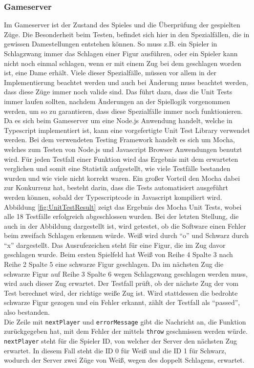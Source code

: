 \documentclass[12pt,a4paper,bibliography=totocnumbered,listof=totocnumbered]{article}
\begin{document}
\subsubsection{Gameserver}
Im Gameserver ist der Zustand des Spieles und die Überprüfung der gespielten Züge. 
Die Besonderheit beim Testen, befindet sich hier in den Spezialfällen, die in gewissen Damestellungen entstehen können. So muss z.B. ein
Spieler in Schlagzwang immer das Schlagen einer Figur ausführen, oder ein Spieler kann nicht noch einmal schlagen, wenn er mit einem Zug bei dem geschlagen worden ist,
eine Dame erhält. Viele dieser Spezialfälle, müssen vor allem in der Implementierung beachtet werden und auch bei Änderung muss beachtet werden, dass 
diese Züge immer noch valide sind. Das führt dazu, dass die Unit Tests immer laufen sollten, nachdem Änderungen an der Spiellogik vorgenommen werden,
um so zu garantieren, dass diese Spezialfälle immer noch funktionieren.
\\
Da es sich beim Gameserver um eine Node.js Anwendung handelt, welche in Typescript implementiert ist, kann eine vorgefertigte Unit Test Library verwendet werden.
Bei dem verwendeten Testing Framework handelt es sich um Mocha, welches zum Testen von Node.js und Javascript Browser Anwendungen benutzt wird. 
Für jeden Testfall einer Funktion wird das Ergebnis mit dem erwarteten verglichen und somit eine Statistik aufgestellt, wie viele Testfälle 
bestanden wurden und wie viele nicht korrekt waren. Ein großer Vorteil den Mocha dabei zur Konkurrenz hat, besteht darin, dass die Tests automatisiert ausgeführt werden 
können, sobald der Typescriptcode in Javascript kompiliert wird.
\\ 
Abbildung \ref{fig:UnitTestResult} zeigt das Ergebnis des Mocha Unit Tests, wobei alle 18 Testfälle erfolgreich abgeschlossen wurden.
Bei der letzten Stellung, die auch in der Abbildung dargestellt ist, wird getestet, ob die Software einen Fehler beim zweifach Schlagen erkennen würde.
Weiß wird durch ``o'' und Schwarz durch ``x'' dargestellt. Das Ausrufezeichen steht für eine Figur, die im Zug davor geschlagen wurde. 
Beim ersten Spielfeld hat Weiß von Reihe 4 Spalte 3 nach Reihe 2 Spalte 5 eine schwarze Figur geschlagen. Da im nächsten Zug die schwarze Figur auf 
Reihe 3 Spalte 6 wegen Schlagzwang geschlagen werden muss, wird auch dieser Zug erwartet. Der Testfall prüft, ob der nächste Zug der 
vom Test berechnet wird, der richtige weiße Zug ist. Wird stattdessen die bedrohte schwarze Figur gezogen und ein Fehler erkannt, zählt der Testfall als ``passed'', also bestanden.
\\
Die Zeile mit \texttt{nextPlayer} und \texttt{errorMessage} gibt die Nachricht an, die Funktion zurückgegeben hat, mit dem Fehler der
mittels \texttt{throw} geschmissen werden würde. \texttt{nextPlayer} steht für die Spieler ID, von welcher der Server den nächsten Zug erwartet.
In diesem Fall steht die ID 0 für Weiß und die ID 1 für Schwarz, wodurch der Server zwei Züge von Weiß, wegen des doppelt Schlagens, erwartet.
\end{document}

